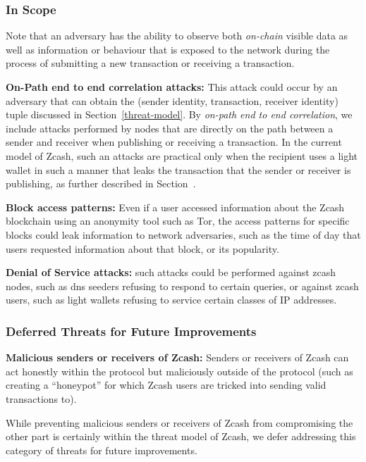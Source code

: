 \documentclass{article}
\begin{document}
\subsubsection{In Scope}
\label{in-scope}

Note that an adversary has the ability to observe both \emph{on-chain} visible
data as well as information or behaviour that is exposed to the network during
the process of submitting a new transaction or receiving a transaction.

\textbf{On-Path end to end correlation attacks:} This attack could occur by an
adversary that can obtain the (sender identity, transaction, receiver identity)
tuple discussed in Section~\ref{threat-model}. By \emph{on-path end to end
correlation}, we include attacks performed by nodes that are directly on the
path between a sender and receiver when publishing or receiving a transaction.
In the current model of Zcash, such an attacks are practical
only when the recipient uses a light wallet in such a manner that leaks the
transaction that the sender or receiver is publishing, as further described in
Section~\cite{light-wallet-spec}.

\textbf{Block access patterns:} Even if a user accessed
information about the Zcash blockchain using an anonymity tool such as Tor, the
access patterns for specific blocks could leak information to network
adversaries, such as the time of day that users requested information about
that block, or its popularity.

\textbf{Denial of Service attacks:} such attacks could be performed against
zcash nodes, such as dns seeders refusing to respond to certain queries, or
against zcash users, such as light wallets refusing to service certain classes
of IP addresses.


\subsubsection{Deferred Threats for Future Improvements}

\textbf{Malicious senders or receivers of Zcash:}
Senders or receivers of Zcash can act honestly within the protocol but
maliciously outside of the protocol (such as creating a ``honeypot'' for which
Zcash users are tricked into sending valid transactions to).

While preventing malicious
senders or receivers of Zcash from compromising the other part is certainly
within the threat model of Zcash, we defer addressing this category of threats
for future improvements.
\end{document}
